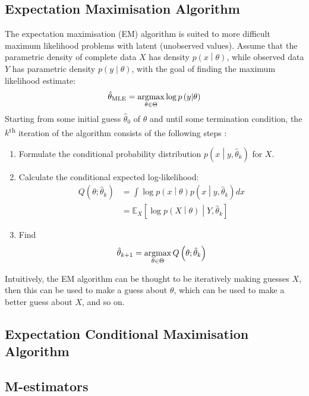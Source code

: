 \documentclass[11pt]{report} %
\begin{document}
\subsection{Expectation Maximisation Algorithm}

The expectation maximisation (EM) algorithm is suited to more difficult maximum likelihood problems with latent (unobserved values). Assume that the parametric density of complete data $X$ has density $p\left(x\middle|\theta\right)$, while observed data $Y$ has parametric density $p\left(y\middle|\theta\right)$, with the goal of finding the maximum likelihood estimate:
\begin{equation}
\hat{\theta}_{\mathrm{MLE}} = \operatorname*{argmax}_{\theta\in\Theta}\log p\left(y\middle|\theta\right)
\end{equation}
Starting from some initial guess $\hat{\theta}_{0}$ of $\theta$ and until some termination condition, the $k$\textsuperscript{th} iteration of the algorithm consists of the following steps \cite{Gupta2010}:
\begin{enumerate}
\item Formulate the conditional probability distribution $p\left(x\middle|y, \hat{\theta}_{k}\right)$ for $X$.
\item Calculate the conditional expected log-likelihood:
\begin{align}
Q\left(\theta;\hat{\theta}_{k}\right) &= \int\log p\left(x\middle|\theta\right)p\left(x\middle|y, \hat{\theta}_{k}\right)dx \\
&= \mathbb{E}_{X}\left[\log p\left(X\middle|\theta\right) \middle| Y, \hat{\theta}_{k}\right]
\end{align}
\item Find
\begin{equation}
\hat{\theta}_{k + 1} = \operatorname*{argmax}_{\theta\in\Theta}Q\left(\theta;\hat{\theta}_{k}\right) 
\end{equation}
\end{enumerate}
Intuitively, the EM algorithm can be thought to be iteratively making guesses $X$, then this can be used to make a guess about $\theta$, which can be used to make a better guess about $X$, and so on.

\subsection{Expectation Conditional Maximisation Algorithm}

\subsection{M-estimators}
\end{document}
